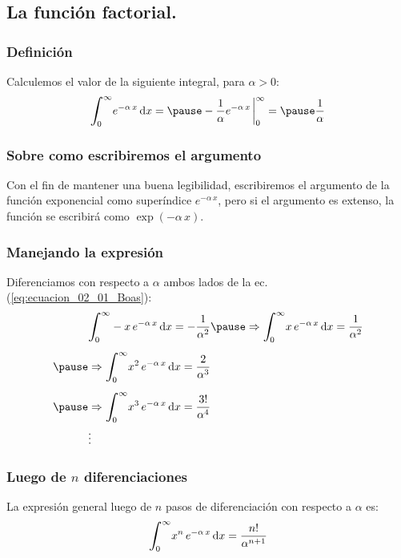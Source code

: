 \documentclass[12pt]{beamer}
\begin{document}
\subsection{La función factorial.}

\begin{frame}
\frametitle{Definición}
Calculemos el valor de la siguiente integral, para $\alpha > 0$:
\pause
\begin{eqnarray}
\scaleint{6ex}_{\bs 0}^{\infty} e^{-\alpha \, x} \dd{x} = \pause - \dfrac{1}{\alpha} e^{-\alpha \, x}\eval_{0}^{\infty} = \pause \dfrac{1}{\alpha}
\label{eq:ecuacion_02_01_Boas}
\end{eqnarray}
\end{frame}
\begin{frame}
\frametitle{Sobre como escribiremos el argumento}
Con el fin de mantener una buena legibilidad, escribiremos el argumento de la función exponencial como superíndice $e^{-\alpha \, x}$, pero si el argumento es extenso, la función se escribirá como $\exp(-\alpha \, x)$.
\end{frame}
\begin{frame}
\frametitle{Manejando la expresión}
Diferenciamos con respecto a $\alpha$ ambos lados de la ec. (\ref{eq:ecuacion_02_01_Boas}):
\pause
\begin{eqnarray*}
\begin{aligned}
&\scaleint{6ex}_{\bs 0}^{\infty} - x \, e^{-\alpha \, x} \dd{x} = - \dfrac{1}{\alpha^{2}} \pause
\Rightarrow \scaleint{6ex}_{\bs 0}^{\infty} x \, e^{-\alpha \, x} \dd{x} = \dfrac{1}{\alpha^{2}} \\[0.5em] \pause
&\Rightarrow \scaleint{6ex}_{\bs 0}^{\infty} x^{2} \, e^{-\alpha \, x} \dd{x} = \dfrac{2}{\alpha^{3}} \\[0.5em] \pause
&\Rightarrow \scaleint{6ex}_{\bs 0}^{\infty} x^{3} \, e^{-\alpha \, x} \dd{x} = \dfrac{3!}{\alpha^{4}} \\
& \vdots
\end{aligned}
\end{eqnarray*}
\end{frame}
\begin{frame}
\frametitle{Luego de $n$ diferenciaciones}
La expresión general luego de $n$ pasos de diferenciación con respecto a $\alpha$ es:
\pause
\begin{align}
\scaleint{6ex}_{\bs 0}^{\infty} x^{n} \, e^{-\alpha \, x} \dd{x} = \dfrac{n!}{\alpha^{n+1}}
\label{eq:ecuacion_02_02}
\end{align}
\end{frame}
\end{document}

